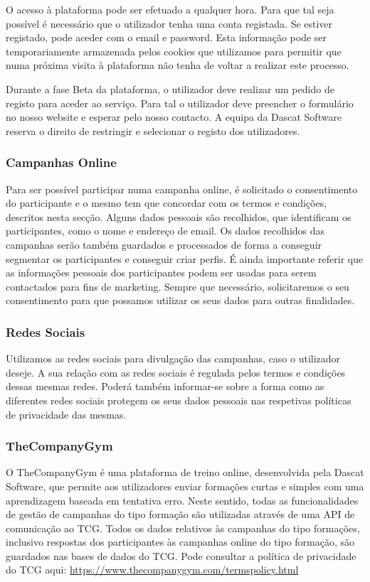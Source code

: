 O acesso à plataforma pode ser efetuado a qualquer hora. Para que tal seja possível é necessário que o utilizador tenha uma conta registada. Se estiver registado, pode aceder com o email e password. Esta informação pode ser temporariamente armazenada pelos cookies que utilizamos para permitir que numa próxima visita à plataforma não tenha de voltar a realizar este processo.

Durante a fase Beta da plataforma, o utilizador deve realizar um pedido de registo para aceder ao serviço. Para tal o utilizador deve preencher o formulário no nosso website e esperar pelo nosso contacto. A equipa da Dascat Software reserva o direito de restringir e selecionar o registo dos utilizadores.

\subsubsection{Campanhas Online}

Para ser possível participar numa campanha online, é solicitado o consentimento do participante e o mesmo tem que concordar com os termos e condições, descritos nesta secção.
Alguns dados pessoais são recolhidos, que identificam os participantes, como o nome e endereço de email. Os dados recolhidos das campanhas serão também guardados e processados de forma a conseguir segmentar os participantes e conseguir criar perfis. É ainda importante referir que as informações pessoais dos participantes podem ser usadas para serem contactados para fins de marketing.
Sempre que necessário, solicitaremos o seu consentimento para que possamos utilizar os seus dados para outras finalidades.

\subsubsection{Redes Sociais}

Utilizamos as redes sociais para divulgação das campanhas, caso o utilizador deseje. A sua relação com as redes sociais é regulada pelos termos e condições dessas mesmas redes. Poderá também informar-se sobre a forma como as diferentes redes sociais protegem os seus dados pessoais nas respetivas políticas de privacidade das mesmas.

\subsubsection{TheCompanyGym}

O TheCompanyGym é uma plataforma de treino online, desenvolvida pela Dascat Software, que permite aos utilizadores enviar formações curtas e simples com uma aprendizagem baseada em tentativa erro. Neste sentido, todas as funcionalidades de gestão de campanhas do tipo formação são utilizadas através de uma API de comunicação ao TCG. Todos os dados relativos às campanhas do tipo formações, inclusivo respostas dos participantes às campanhas online do tipo formação, são guardados nas bases de dados do TCG. Pode consultar a política de privacidade do TCG aqui: \url{https://www.thecompanygym.com/termspolicy.html}


